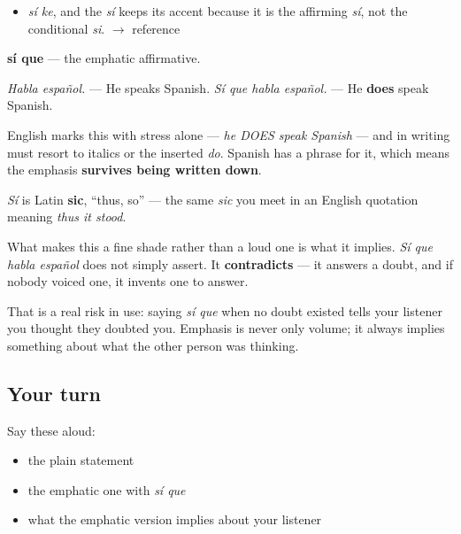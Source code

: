 \begin{sounds}
\begin{itemize}
\raggedright
  \item \emph{sí ke}, and the \emph{sí} keeps its accent because it is the affirming \emph{sí}, not the conditional \emph{si}. $\to$ reference
\end{itemize}
\end{sounds}

\begin{cousinweb}
\textbf{sí que} — the emphatic affirmative.

\emph{Habla español.} — He speaks Spanish. \emph{Sí que habla español.} — He \textbf{does} speak Spanish.

English marks this with stress alone — \emph{he DOES speak Spanish} — and in writing must resort to italics or the inserted \emph{do}. Spanish has a phrase for it, which means the emphasis \textbf{survives being written down}.

\emph{Sí} is Latin \textbf{sic}, \textquotedblleft{}thus, so\textquotedblright{} — the same \emph{sic} you meet in an English quotation meaning \emph{thus it stood}.
\end{cousinweb}

\begin{grammarlens}[title={What you've built}]
What makes this a fine shade rather than a loud one is what it implies. \emph{Sí que habla español} does not simply assert. It \textbf{contradicts} — it answers a doubt, and if nobody voiced one, it invents one to answer.

That is a real risk in use: saying \emph{sí que} when no doubt existed tells your listener you thought they doubted you. Emphasis is never only volume; it always implies something about what the other person was thinking.
\end{grammarlens}

\subsection*{Your turn}
Say these aloud:

\begin{itemize}
\raggedright
  \item the plain statement
  \item the emphatic one with \emph{sí que}
  \item what the emphatic version implies about your listener
\end{itemize}

